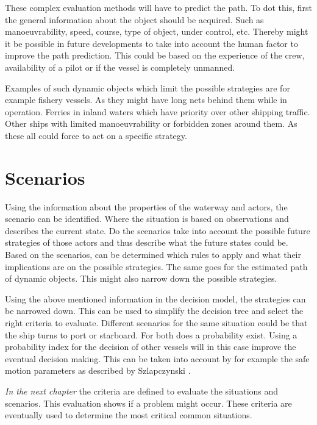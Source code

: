 These complex evaluation methods will have to predict the path. To dot this, first the general information about the object should be acquired. Such as manoeuvrability, speed, course, type of object, under control, etc.
Thereby might it be possible in future developments to take into account the human factor to improve the path prediction. This could be based on the experience of the crew, availability of a pilot or if the vessel is completely unmanned.

Examples of such dynamic objects which limit the possible strategies are for example fishery vessels. As they might have long nets behind them while in operation. Ferries in inland waters which have priority over other shipping traffic. Other ships with limited manoeuvrability or forbidden zones around them. As these all could force to act on a specific strategy.

\section{Scenarios}
Using the information about the properties of the waterway and actors, the scenario can be identified. Where the situation is based on observations and describes the current state. Do the scenarios take into account the possible future strategies of those actors and thus describe what the future states could be.
Based on the scenarios, can be determined which rules to apply and what their implications are on the possible strategies. The same goes for the estimated path of dynamic objects. This might also narrow down the possible strategies.

Using the above mentioned information in the decision model, the strategies can be narrowed down. This can be used to simplify the decision tree and select the right criteria to evaluate.
Different scenarios for the same situation could be that the ship turns to port or starboard. For both does a probability exist. Using a probability index for the decision of other vessels will in this case improve the eventual decision making. This can be taken into account by for example the safe motion parameters as described by Szlapczynski \cite{Szlapczynski2017}.

\vspace{1.5cm}
\emph{In the next chapter} the criteria are defined to evaluate the situations and scenarios. This evaluation shows if a problem might occur. These criteria are eventually used to determine the most critical common situations. 

